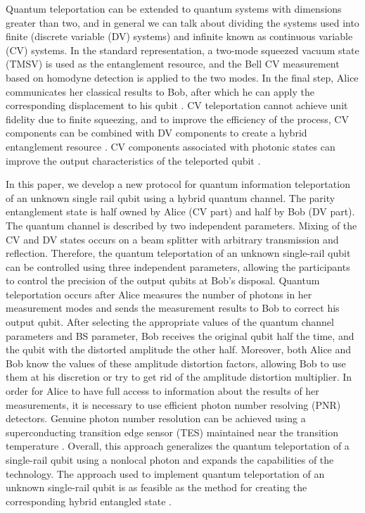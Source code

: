 \documentclass{optica-article}
\begin{document}
\par Quantum teleportation can be extended to quantum systems with dimensions greater than two, and in general we can talk about dividing the systems used into finite (discrete variable (DV) systems) and infinite known as continuous variable (CV) systems. In the standard representation, a two-mode squeezed vacuum state (TMSV) is used as the entanglement resource, and the Bell CV measurement based on homodyne detection is applied to the two modes. In the final step, Alice communicates her classical results to Bob, after which he can apply the corresponding displacement to his qubit \cite{26,27,28}. CV teleportation cannot achieve unit fidelity due to finite squeezing, and to improve the efficiency of the process, CV components can be combined with DV components to create a hybrid entanglement resource \cite{29,30,31,32,33,34,35}. CV components associated with photonic states can improve the output characteristics of the teleported qubit \cite{36,37,38,39}. 
\par In this paper, we develop a new protocol for quantum information teleportation of an unknown single rail qubit using a hybrid quantum channel. The parity entanglement state is half owned by Alice (CV part) and half by Bob (DV part). The quantum channel is described by two independent parameters. Mixing of the CV and DV states occurs on a beam splitter with arbitrary transmission and reflection. Therefore, the quantum teleportation of an unknown single-rail qubit can be controlled using three independent parameters, allowing the participants to control the precision of the output qubits at Bob's disposal. Quantum teleportation occurs after Alice measures the number of photons in her measurement modes and sends the measurement results to Bob to correct his output qubit. After selecting the appropriate values of the quantum channel parameters and BS parameter, Bob receives the original qubit half the time, and the qubit with the distorted amplitude the other half. Moreover, both Alice and Bob know the values of these amplitude distortion factors, allowing Bob to use them at his discretion or try to get rid of the amplitude distortion multiplier. In order for Alice to have full access to information about the results of her measurements, it is necessary to use efficient photon number resolving (PNR) detectors. Genuine photon number resolution can be achieved using a superconducting transition edge sensor (TES) maintained near the transition temperature \cite{40,41}. Overall, this approach generalizes the quantum teleportation of a single-rail qubit using a nonlocal photon and expands the capabilities of the technology. The approach used to implement quantum teleportation of an unknown single-rail qubit is as feasible as the method for creating the corresponding hybrid entangled state \cite{34}.  
\end{document}
